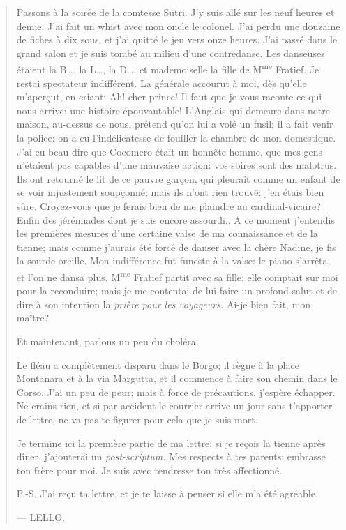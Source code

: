 \begin{quote}
Passons à la soirée de la comtesse Sutri. J'y suis allé sur les neuf
heures et demie. J'ai fait un whist avec mon oncle le colonel. J'ai
perdu une douzaine de fiches à dix sous, et j'ai quitté le jeu vers onze
heures. J'ai passé dans le grand salon et je suis tombé au milieu d'une
contredanse. Les danseuses étaient la B\ldots, la L\ldots, la D\ldots,
et mademoiselle la fille de M\textsuperscript{me} Fratief. Je restai
spectateur indifférent. La générale accourut à moi, dès qu'elle
m'aperçut, en criant: Ah! cher prince! Il faut que je vous raconte ce
qui nous arrive: une histoire épouvantable! L'Anglais qui demeure dans
notre maison, au-dessus de nous, prétend qu'on lui a volé un fusil; il a
fait venir la police: on a eu l'indélicatesse de fouiller la chambre de
mon domestique. J'ai eu beau dire que Cocomero était un honnête homme,
que mes gens n'étaient pas capables d'une mauvaise action: vos sbires
sont des malotrus. Ils ont retourné le lit de ce pauvre garçon, qui
pleurait comme un enfant de se voir injustement soupçonné; mais ils
n'ont rien trouvé: j'en étais bien sûre. Croyez-vous que je ferais bien
de me plaindre au cardinal-vicaire? Enfin des jérémiades dont je suis
encore assourdi.. A ce moment j'entendis les premières mesures d'une
certaine valse de ma connaissance et de la tienne; mais comme j'aurais
été forcé de danser avec la chère Nadine, je fis la sourde oreille. Mon
indifférence fut funeste à la valse: le piano s'arrêta, et l'on ne dansa
plus. M\textsuperscript{me} Fratief partit avec sa fille: elle comptait
sur moi pour la reconduire; mais je me contentai de lui faire un profond
salut et de dire à son intention la \emph{prière pour les voyageurs.}
Ai-je bien fait, mon maître?

Et maintenant, parlons un peu du choléra.

Le fléau a complètement disparu dans le Borgo; il règne à la place
Montanara et à la via Margutta, et il commence à faire son chemin dans
le Corso. J'ai un peu de peur; mais à force de précautions, j'espère
échapper. Ne crains rien, et si par accident le courrier arrive un jour
sans t'apporter de lettre, ne va pas te figurer pour cela que je suis
mort.

Je termine ici la première partie de ma lettre: si je reçois la tienne
après dîner, j'ajouterai un \emph{post-scriptum.} Mes respects à tes
parents; embrasse ton frère pour moi. Je suis avec tendresse ton très
affectionné.

P.-S. J'ai reçu ta lettre, et je te laisse à penser si elle m'a été
agréable.

--- LELLO.
\end{quote}


